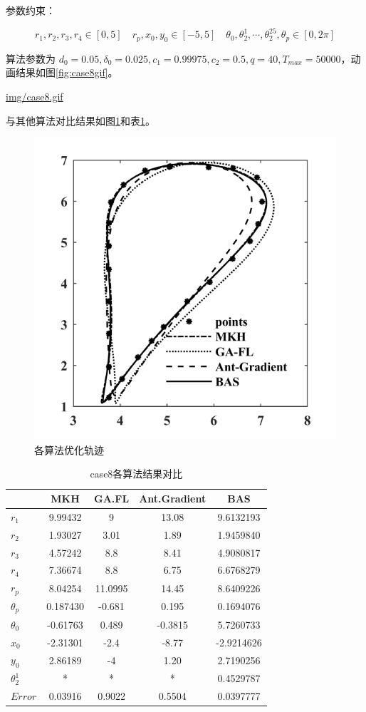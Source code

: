 \documentclass[]{ctexbook}
\begin{document}
参数约束：

\[
r_1,r_2,r_3,r_4\in[0,5]\quad r_p,x_0,y_0\in[-5,5] \quad \theta_0,\theta_2^1,\cdots,\theta_2^{25},\theta_p\in[0,2\pi]
\]

算法参数为
\(d_0 = 0.05,\delta_0=0.025,c_1=0.99975,c_2=0.5,q=40,T_{max}=50000\)，动画结果如图\ref{fig:case8gif}。

\url{img/case8.gif}

与其他算法对比结果如图\ref{fig:case8png}和表\ref{tab:case8table}。

\begin{figure}

{\centering \includegraphics[width=0.5\linewidth]{img/case8png} 

}

\caption{各算法优化轨迹}\label{fig:case8png}
\end{figure}

\begin{table}[t]

\caption{\label{tab:case8table}case8各算法结果对比}
\centering
\begin{tabular}{lcccc}
\toprule
  & MKH & GA.FL & Ant.Gradient & BAS\\
\midrule
$r_1$ & 9.99432 & 9 & 13.08 & 9.6132193\\
$r_2$ & 1.93027 & 3.01 & 1.89 & 1.9459840\\
$r_3$ & 4.57242 & 8.8 & 8.41 & 4.9080817\\
$r_4$ & 7.36674 & 8.8 & 6.75 & 6.6768279\\
$r_p$ & 8.04254 & 11.0995 & 14.45 & 8.6409226\\
\addlinespace
$\theta_p$ & 0.187430 & -0.681 & 0.195 & 0.1694076\\
$\theta_0$ & -0.61763 & 0.489 & -0.3815 & 5.7260733\\
$x_0$ & -2.31301 & -2.4 & -8.77 & -2.9214626\\
$y_0$ & 2.86189 & -4 & 1.20 & 2.7190256\\
$\theta_2^1$ & * & * & * & 0.4529787\\
\addlinespace
$Error$ & 0.03916 & 0.9022 & 0.5504 & 0.0397777\\
\bottomrule
\end{tabular}
\end{table}
\end{document}
